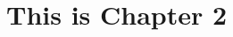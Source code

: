 \documentclass[../main/thesis.tex]{subfiles}
\begin{document}
\chapter{This is Chapter 2}
\label{ch:2}



\bib
\end{document}
